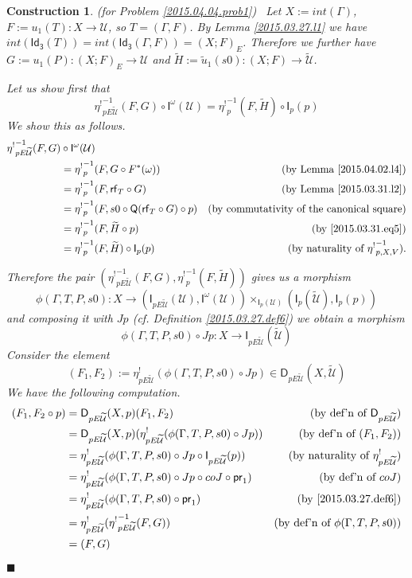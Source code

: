 \documentclass[12pt]{article}
\numberwithin{equation}{section}
\newtheorem{construction0}[proposition]{Construction}
\newenvironment{construction}[1]{\begin{construction0}(for Problem \ref{#1})\ }{$\blacksquare$ \end{construction0}}
\newcommand{\by}[1]{\text{(by #1)}}
\newcommand{\sr}{\rightarrow}
\newcommand{\wt}{\widetilde}
\newcommand{\Idx}{\mathsf{Id_3}} %
\newcommand{\U}{\mathcal{U}}
\newcommand{\D}{\mathsf{D}}
\newcommand{\I}{\mathsf{I}}
\newcommand{\rf}{\mathsf{rf}}
\newcommand{\Q}{\mathsf{Q}}
\newcommand{\etashriek}{\eta^!}
\newcommand{\etaunshriek}{{\etashriek}^{-1}}
\newcommand{\pr}{\mathsf{pr}}
\begin{document}
\begin{construction}{2015.04.04.prob1}\rm
\label{2015.04.04.constr1} Let $X:=int(\Gamma)$, $F:=u_1(T):X\sr \U$, so $T = (\Gamma,F)$. By Lemma
\ref{2015.03.27.l1} we have
$int(\Idx(T))=int(\Idx(\Gamma,F))=(X;F)_{E}$. Therefore we further
have $G:=u_1(P):(X;F)_{E}\sr \U$ and $\wt{H}:=\wt{u}_1(s0):(X;F)\sr
\wt{\U}$.

Let us show first that
%
$$\etaunshriek_{pE\wt{\U}}(F,G)\circ \I^{\omega}(\U)=\etaunshriek_p(F,\wt{H})\circ \I_p(p)$$
%
We show this as follows.
%
\begin{align*}
  \etaunshriek_{pE\wt{\U}}(F,G) & \circ \I^{\omega}(\U) \\
    & = \etaunshriek_p(F,G\circ F^*(\omega)) & \by{Lemma \ref{2015.04.02.l4}} \\
    & = \etaunshriek_p(F,\rf_T\circ G) & \by{Lemma \ref{2015.03.31.l2}}  \\
    & = \etaunshriek_p(F,s0\circ \Q(\rf_T\circ G)\circ p) & \by{commutativity of the canonical square}  \\
    & = \etaunshriek_p(F,\wt{H}\circ p) & \by{\ref{2015.03.31.eq5}}  \\
    & = \etaunshriek_p(F,\wt{H})\circ \I_p(p) & \by{naturality of $\etaunshriek_{p,X,V}$}.
\end{align*}

Therefore the pair $(\etaunshriek_{pE\wt{\U}}(F,G),\etaunshriek_p(F,\wt{H}))$ gives us a
morphism
%
$$\phi(\Gamma,T,P,s0):X\sr (\I_{pE\wt{\U}}(\U), \I^{\omega}(\U)) \times_{\I_p(\U)}
(\I_p(\wt{\U}),\I_p(p))$$
%
and composing it with $Jp$ (cf. Definition \ref{2015.03.27.def6}) we obtain a
morphism
%
$$\phi(\Gamma,T,P,s0)\circ Jp: X\sr \I_{pE\wt{\U}}(\wt{\U})$$
%
Consider the element
%
$$(F_1,F_2) := \etashriek_{pE\wt{\U}}(\phi(\Gamma,T,P,s0)\circ Jp)\in
\D_{pE\wt{\U}}(X,\wt{\U})$$
%
We have the following computation.
%
\begin{align*}
  (F_1,F_2\circ p)
  & = \D_{pE\wt{\U}}(X,p)(F_1,F_2)  & \by{def'n of $\D_{pE\wt{\U}}$} \\
  & = \D_{pE\wt{\U}}(X,p)(\etashriek_{pE\wt{\U}}(\phi(\Gamma,T,P,s0)\circ Jp))  & \by{def'n of $(F_1,F_2)$} \\
  & = \etashriek_{pE\wt{\U}}(\phi(\Gamma,T,P,s0)\circ Jp\circ \I_{pE\wt{\U}}(p))  & \by{naturality of $\etashriek_{pE\wt{\U}}$} \\
  & = \etashriek_{pE\wt{\U}}(\phi(\Gamma,T,P,s0)\circ Jp\circ coJ \circ \pr_1)  & \by{def'n of $coJ$} \\
  & = \etashriek_{pE\wt{\U}}(\phi(\Gamma,T,P,s0)\circ \pr_1)  & \by{\ref{2015.03.27.def6}} \\
  & = \etashriek_{pE\wt{\U}}(\etaunshriek_{pE\wt{\U}}(F,G)) & \by{def'n of $\phi(\Gamma,T,P,s0)$} \\
  & =(F,G)
\end{align*}


\end{construction}
\end{document}
